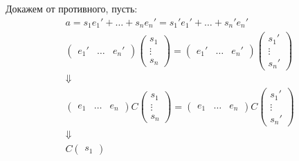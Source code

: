 \begin{itemize}
        Докажем от противного, пусть:
        \begin{gather*}
            a = s_1 e_1' + \ldots + s_n e_n' = s_1' e_1' + \ldots + s_n' e_n'
            \\
            \begin{pmatrix}
                e_1' & \ldots & e_n'
            \end{pmatrix}
            \begin{pmatrix}
                s_1
                \\
                \vdots
                \\
                s_n
            \end{pmatrix}
            =
            \begin{pmatrix}
                e_1' & \ldots & e_n'
            \end{pmatrix}
            \begin{pmatrix}
                s_1'
                \\
                \vdots
                \\
                s_n'
            \end{pmatrix}
            \\
            \Downarrow
            \\
            \begin{pmatrix}
                e_1 & \ldots & e_n
            \end{pmatrix}
            C
            \begin{pmatrix}
                s_1
                \\
                \vdots
                \\
                s_n
            \end{pmatrix}
            =
            \begin{pmatrix}
                e_1 & \ldots & e_n
            \end{pmatrix}
            C
            \begin{pmatrix}
                s_1'
                \\
                \vdots
                \\
                s_n'
            \end{pmatrix}
            \\
            \Downarrow
            \\
            C
            \begin{pmatrix}
                s_1

\end{pmatrix}
\end{gather*}
\end{itemize}
